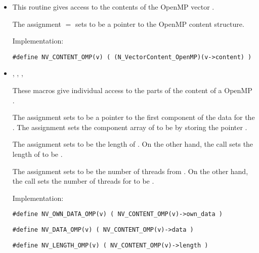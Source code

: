 \begin{itemize}

\item {}                             
    
  This routine gives access to the contents of the OpenMP
  vector .
  
  The assignment  $=$  sets           
   to be a pointer to the OpenMP  content  
  structure.                                             
                                                            
  Implementation: 
  
  \verb|#define NV_CONTENT_OMP(v) ( (N_VectorContent_OpenMP)(v->content) )|
  
\item {}, , , 


  These macros give individual access to the parts of    
  the content of a OpenMP .                        
                                                               
  The assignment  sets  to be     
  a pointer to the first component of the data for the  . 
  The assignment  sets the component array of  to     
  be  by storing the pointer .                   
  
  The assignment  sets  to be     
  the length of . On the other hand, the call  
  sets the length of  to be .
                                                            
  The assignment  sets  to be     
  the number of threads from . On the other hand, the call  
  sets the number of threads for  to be .
                                                            
  Implementation: 
  
  \verb|#define NV_OWN_DATA_OMP(v) ( NV_CONTENT_OMP(v)->own_data )|

  \verb|#define NV_DATA_OMP(v) ( NV_CONTENT_OMP(v)->data )|
  
  \verb|#define NV_LENGTH_OMP(v) ( NV_CONTENT_OMP(v)->length )|


\end{itemize}
